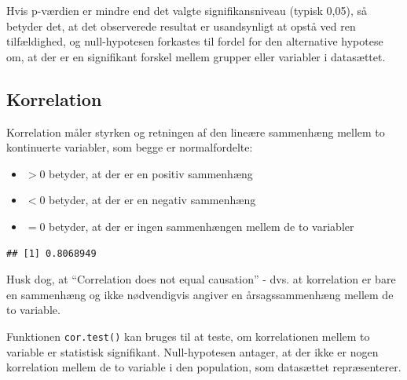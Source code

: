 \documentclass[
]{book}
\newenvironment{Shaded}{\begin{snugshade}}{\end{snugshade}}
\newcommand{\FunctionTok}[1]{\textcolor[rgb]{0.13,0.29,0.53}{\textbf{#1}}}
\newcommand{\NormalTok}[1]{#1}
\newcommand{\SpecialCharTok}[1]{\textcolor[rgb]{0.81,0.36,0.00}{\textbf{#1}}}
\providecommand{\tightlist}{%
  \setlength{\itemsep}{0pt}\setlength{\parskip}{0pt}}
\begin{document}
Hvis p-værdien er mindre end det valgte signifikansniveau (typisk 0,05), så betyder det, at det observerede resultat er usandsynligt at opstå ved ren tilfældighed, og null-hypotesen forkastes til fordel for den alternative hypotese om, at der er en signifikant forskel mellem grupper eller variabler i datasættet.

\subsection{Korrelation}\label{korrelation}

Korrelation måler styrken og retningen af den lineære sammenhæng mellem to kontinuerte variabler, som begge er normalfordelte:

\begin{itemize}
\tightlist
\item
  \(>0\) betyder, at der er en positiv sammenhæng
\item
  \(<0\) betyder, at der er en negativ sammenhæng
\item
  \(=0\) betyder, at der er ingen sammenhængen mellem de to variabler
\end{itemize}

\begin{Shaded}
\end{Shaded}

\begin{verbatim}
## [1] 0.8068949
\end{verbatim}

Husk dog, at ``Correlation does not equal causation'' - dvs. at korrelation er bare en sammenhæng og ikke nødvendigvis angiver en årsagssammenhæng mellem de to variable.

Funktionen \texttt{cor.test()} kan bruges til at teste, om korrelationen mellem to variable er statistisk signifikant. Null-hypotesen antager, at der ikke er nogen korrelation mellem de to variable i den population, som datasættet repræsenterer.

\begin{Shaded}
\end{Shaded}
\end{document}
